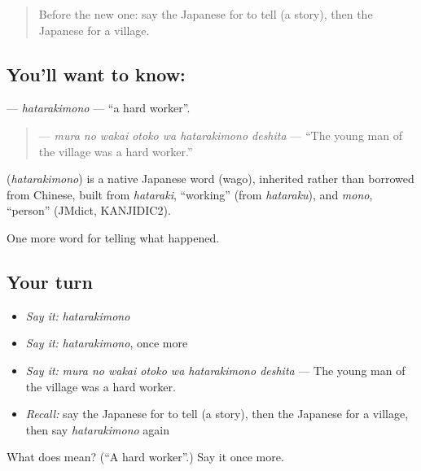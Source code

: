 \label{lesson:JA-C298-hatarakimono}



\begin{quote}
Before the new one: say the Japanese for to tell (a story), then the Japanese for a village.
\end{quote}

\subsection*{You'll want to know: }
\textbf{} — \emph{hatarakimono} — \textquotedblleft{}a hard worker\textquotedblright{}.

\begin{quote}
\textbf{   } — \emph{mura no wakai otoko wa hatarakimono deshita} — \textquotedblleft{}The young man of the village was a hard worker.\textquotedblright{}
\end{quote}

\begin{cousinweb}
\textbf{} (\emph{hatarakimono}) is a native Japanese word (wago), inherited rather than borrowed from Chinese, built from \emph{hataraki}, \textquotedblleft{}working\textquotedblright{} (from \emph{hataraku}), and \emph{mono}, \textquotedblleft{}person\textquotedblright{} (JMdict, KANJIDIC2).
\end{cousinweb}

\begin{grammarlens}[title={What you've built}]
One more word for telling what happened.
\end{grammarlens}

\subsection*{Your turn}
\begin{itemize}
\raggedright
  \item \emph{Say it:} \emph{hatarakimono}
  \item \emph{Say it:} \emph{hatarakimono}, once more
  \item \emph{Say it:} \emph{mura no wakai otoko wa hatarakimono deshita} — The young man of the village was a hard worker.
  \item \emph{Recall:} say the Japanese for to tell (a story), then the Japanese for a village, then say \emph{hatarakimono} again
\end{itemize}

\begin{tcolorbox}[breakable,colback=teal!4,colframe=teal!35!black,title={Before you move on}]
What does  mean? (\textquotedblleft{}A hard worker\textquotedblright{}.) Say it once more.
\end{tcolorbox}
